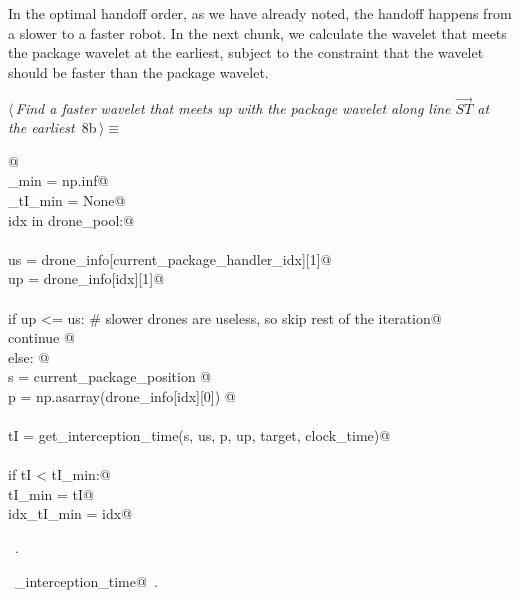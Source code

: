 \documentclass[10pt, english, oneside]{report}
\begin{document}
In the optimal handoff order, as we have already noted, the handoff happens from a slower to a faster robot. 
In the next chunk, we calculate the wavelet that meets the package wavelet at the earliest, subject to the 
constraint that the wavelet should be faster than the package wavelet. 


\begin{flushleft} \small
\begin{minipage}{\linewidth}\label{scrap5}\raggedright\small
{} $\langle\,${\itshape Find a faster wavelet that meets up with the package wavelet along line $\vec{ST}$ at the earliest}\nobreak\ {\footnotesize {8b}}$\,\rangle\equiv$
\vspace{-1ex}
\begin{list}{}{} \item
\mbox{}\verb@   @\\
\mbox{}\verb@tI_min     = np.inf@\\
\mbox{}\verb@idx_tI_min = None@\\
\mbox{}\verb@for idx in drone_pool:@\\
\mbox{}\verb@@\\
\mbox{}\verb@      us = drone_info[current_package_handler_idx][1]@\\
\mbox{}\verb@      up = drone_info[idx][1]@\\
\mbox{}\verb@@\\
\mbox{}\verb@      if up <= us: # slower drones are useless, so skip rest of the iteration@\\
\mbox{}\verb@          continue @\\
\mbox{}\verb@      else: @\\
\mbox{}\verb@        s = current_package_position @\\
\mbox{}\verb@        p = np.asarray(drone_info[idx][0]) @\\
\mbox{}\verb@@\\
\mbox{}\verb@        tI = get_interception_time(s, us, p, up, target, clock_time)@\\
\mbox{}\verb@@\\
\mbox{}\verb@        if tI < tI_min:@\\
\mbox{}\verb@           tI_min     = tI@\\
\mbox{}\verb@           idx_tI_min = idx@\\
\mbox{}\verb@@{\NWsep}
\end{list}
\vspace{-1.5ex}
\footnotesize
\begin{list}{}{\setlength{\itemsep}{-\parsep}\setlength{\itemindent}{-\leftmargin}}
\item \NWtxtMacroRefIn\ .
\item \NWtxtIdentsUsed\nobreak\  \verb@get_interception_time@\nobreak\ .
\item{}
\end{list}
\end{minipage}\vspace{4ex}
\end{flushleft}
\end{document}
